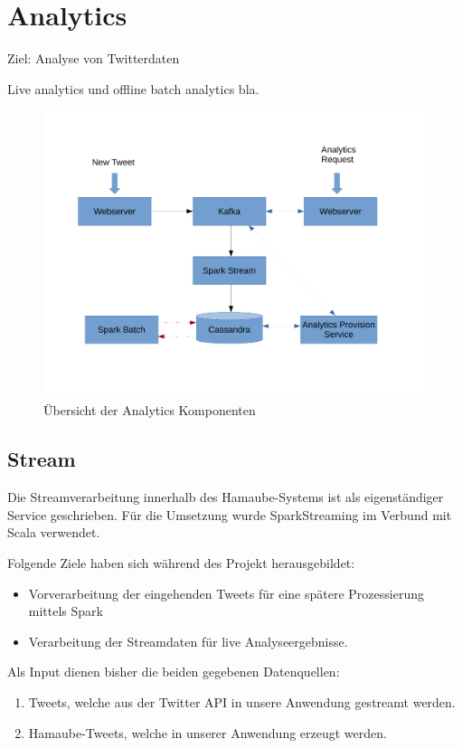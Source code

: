 

\chapter{Analytics}
\label{Analytics}

Ziel: Analyse von Twitterdaten

Live analytics und offline batch analytics bla.

\begin{figure}[htbp!]
	\centering
	\includegraphics[width=\textwidth]{pics/analytics/archi}
	\caption{Übersicht der Analytics Komponenten}
\end{figure}

\section{Stream}

Die Streamverarbeitung innerhalb des Hamaube-Systems ist als eigenständiger Service geschrieben. Für die Umsetzung wurde SparkStreaming im Verbund mit Scala verwendet.

Folgende Ziele haben sich während des Projekt herausgebildet:
\begin{itemize}
	\item Vorverarbeitung der eingehenden Tweets für eine spätere Prozessierung mittels Spark
	\item Verarbeitung der Streamdaten für live Analyseergebnisse.
\end{itemize}


Als Input dienen bisher die beiden gegebenen Datenquellen:
\begin{enumerate}
	\item Tweets, welche aus der Twitter API in unsere Anwendung gestreamt werden.
	\item Hamaube-Tweets, welche in unserer Anwendung erzeugt werden.
\end{enumerate}

